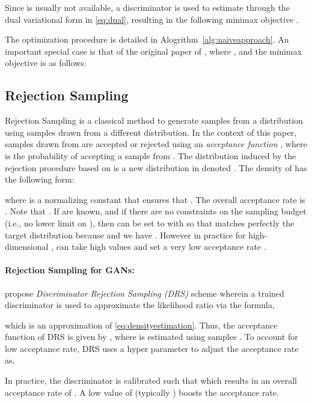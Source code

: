 \documentclass[twoside]{article}
\begin{document}
Since  is usually not available, a discriminator  is used to estimate  through the dual variational form in \eqref{eq:dual}, resulting in the following minimax objective \citep{nowozin_f-gan_2016}.

The optimization procedure is detailed in Alogrithm~\ref{alg:naiveapproach}. 
An important special case is that of the original paper of \cite{goodfellow_generative_2014}, where , and the minimax objective is as follows:




\subsection{Rejection Sampling}\label{subsec: rejection sampling}
\label{subsec:rejsam}
Rejection Sampling is a classical method to generate samples from a distribution using samples drawn from a different distribution. In the context of this paper,  samples drawn from  are accepted or rejected using an {\em acceptance function} , where  is the probability of accepting a sample  from . The distribution induced by the rejection procedure based on  is a new distribution in  denoted . 
The density  of  has the following form:
 
where  is a normalizing constant that ensures that . The overall acceptance rate is . Note that .
If  are known, and if there are no constraints on the sampling budget (i.e., no lower limit on ), then  can be set to  with  so that  matches perfectly the target distribution  because  and we have . 
However in practice for high-dimensional ,  can take high values and set a very low acceptance rate \citep{mackay_information_2005}.




\paragraph{Rejection Sampling for GANs:}
\cite{azadi_discriminator_2019} propose \emph{Discriminator Rejection Sampling (DRS)} scheme wherein a trained discriminator  is used to approximate the likelihood ratio via the formula,

which is an approximation of \eqref{eq:densityestimation}.
Thus, the acceptance function of DRS is given by ,
where  is estimated using samples . To account for low acceptance rate, DRS uses a hyper parameter  to adjust the acceptance rate as,

In practice, the discriminator  is calibrated such that  which results in an overall acceptance rate of . A low value of  (typically ) boosts the acceptance rate. 
\end{document}
